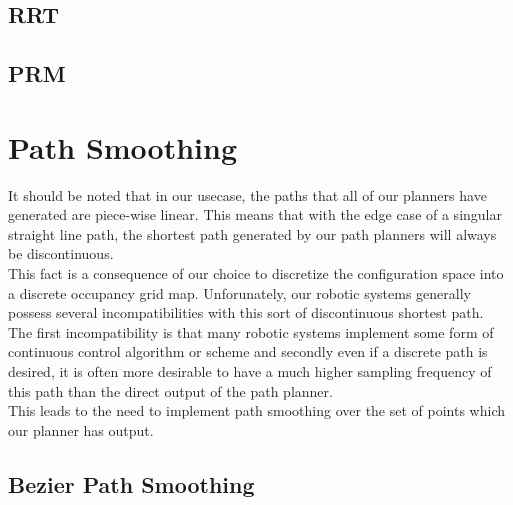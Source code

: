 \documentclass[journal]{IEEEtran}
\begin{document}
\subsection{RRT}
\subsection{PRM}




\section{Path Smoothing}

It should be noted that in our usecase, the paths that all of our planners have generated are piece-wise linear. This means that with the edge case of a singular straight line path, the shortest path generated by our path planners will always be discontinuous. \\

This fact is a consequence of our choice to discretize the configuration space into a discrete occupancy grid map. Unforunately, our robotic systems generally possess several incompatibilities with this sort of discontinuous shortest path. \\

The first incompatibility is that many robotic systems implement some form of continuous control algorithm or scheme and secondly even if a discrete path is desired, it is often more desirable to have a much higher sampling frequency of this path than the direct output of the path planner. \\

This leads to the need to implement path smoothing over the set of points which our planner has output.

\subsection{Bezier Path Smoothing}
\end{document}

